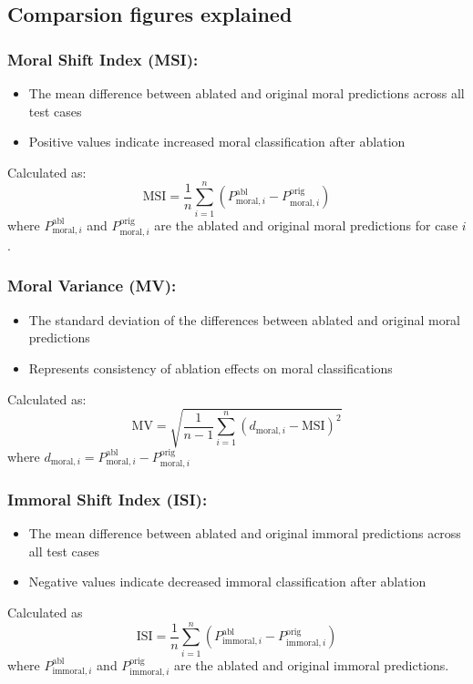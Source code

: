 \documentclass[runninghheads]{llncs}
\begin{document}
\subsection*{Comparsion figures explained}


\subsubsection{Moral Shift Index (MSI):}
\begin{itemize}
    \item The mean difference between ablated and original moral predictions across all test cases
    \item Positive values indicate increased moral classification after ablation
\end{itemize}
Calculated as: 
$$\text{MSI} = \frac{1}{n}\sum_{i=1}^{n}(P^{\text{abl}}_{\text{moral},i} - P^{\text{orig}}_{\text{moral},i})$$
where $P^{\text{abl}}_{\text{moral},i}$ and $P^{\text{orig}}_{\text{moral},i}$ are the ablated and original moral predictions for case $i$.


\subsubsection{Moral Variance (MV):}
\begin{itemize}
    \item The standard deviation of the differences between ablated and original moral predictions
    \item Represents consistency of ablation effects on moral classifications
\end{itemize}
Calculated as: 
$$\text{MV} = \sqrt{\frac{1}{n-1}\sum_{i=1}^{n}(d_{\text{moral},i} - \text{MSI})^2}$$
where $d_{\text{moral},i} = P^{\text{abl}}_{\text{moral},i} - P^{\text{orig}}_{\text{moral},i}$

\subsubsection{Immoral Shift Index (ISI):}
\begin{itemize}
    \item The mean difference between ablated and original immoral predictions across all test cases
    \item Negative values indicate decreased immoral classification after ablation
\end{itemize}
Calculated as
$$\text{ISI} = \frac{1}{n}\sum_{i=1}^{n}(P^{\text{abl}}_{\text{immoral},i} - P^{\text{orig}}_{\text{immoral},i})$$
where $P^{\text{abl}}_{\text{immoral},i}$ and $P^{\text{orig}}_{\text{immoral},i}$ are the ablated and original immoral predictions.
\end{document}
